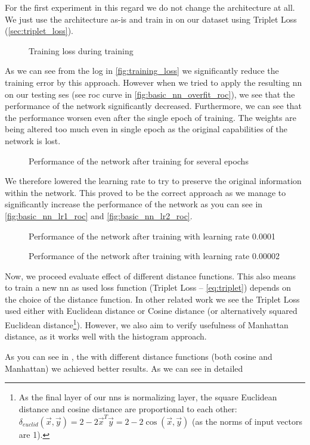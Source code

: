 For the first experiment in this regard we do not change the architecture at all. We just use the architecture as-is and train in on our dataset using Triplet Loss (\autoref{sec:triplet_loss}).

\begin{figure}
    \centering
    \def\svgwidth{\columnwidth}
    \large
    \scalebox{0.8}{}
    \caption{Training loss during training}
    \label{fig:training_loss}
\end{figure}

As we can see from the log in \autoref{fig:training_loss} we significantly reduce the training error by this approach. However when we tried to apply the resulting \gls{nn} on our testing \gls{ses} (see \gls{roc} curve in \autoref{fig:basic_nn_overfit_roc}), we see that the performance of the network significantly decreased. Furthermore, we can see that the performance worsen even after the single epoch of training. The weights are being altered too much even in single epoch as the original capabilities of the network is lost.

\begin{figure}
    \centering
    \def\svgwidth{\columnwidth}
    
    \caption{Performance of the network after training for several epochs}
    \label{fig:basic_nn_overfit_roc}
\end{figure}

We therefore lowered the learning rate to try to preserve the original information within the network. This proved to be the correct approach as we manage to significantly increase the performance of the network as you can see in \autoref{fig:basic_nn_lr1_roc} and \autoref{fig:basic_nn_lr2_roc}.

\begin{figure}
    \centering
    \def\svgwidth{\columnwidth}
    
    \caption{Performance of the network after training with learning rate 0.0001}
    \label{fig:basic_nn_lr1_roc}
\end{figure}

\begin{figure}
    \centering
    \def\svgwidth{\columnwidth}
    
    \caption{Performance of the network after training with learning rate 0.00002}
    \label{fig:basic_nn_lr2_roc}
\end{figure}

Now, we proceed evaluate effect of different distance functions. This also means to train a new \gls{nn} as used loss function (Triplet Loss -- \autoref{eq:triplet}) depends on the choice of the distance function. In other related work we see the Triplet Loss used either with Euclidean distance or Cosine distance (or alternatively squared Euclidean distance\footnote{As the final layer of our \glspl{nn} is normalizing layer, the square Euclidean distance and cosine distance are proportional to each other: $\delta_{euclid}(\vec{x}, \vec{y}) = 2 - 2\vec{x}^T\vec{y} = 2 - 2 \cos(\vec{x}, \vec{y})$ (as the norms of input vectors are 1).}). However, we also aim to verify usefulness of Manhattan distance, as it works well with the histogram approach.

As you can see in , the with different distance functions (both cosine and Manhattan) we achieved better results. As we can see in detailed 

